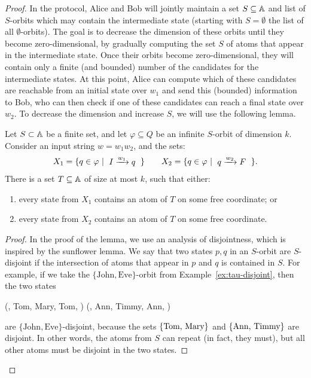 \begin{proof}
In the protocol, Alice and Bob will jointly maintain a set $S \subseteq \mathbb A$ and list of $S$-orbits which may contain the intermediate state (starting with $S = \emptyset$ the list of all $\emptyset$-orbits).
The goal is to decrease the dimension of these orbits until they become zero-dimensional, by gradually computing the set $S$ of atoms that appear in the intermediate state. Once their orbits become zero-dimensional, they will contain only a finite (and bounded) number of the candidates
for the intermediate states. At this point, Alice can compute which of these candidates are reachable from an initial state over $w_1$ and send this (bounded) information to Bob, who can then check if one of these candidates can reach a final state over $w_2$. To decrease the dimension and increase $S$, we will use the following lemma.
\begin{lemma}\label{lem:fixed-atoms}
        Let $S \subset \mathbb A$ be a finite set, and let $\varphi \subseteq Q$ be an infinite $S$-orbit 
        of dimension $k$. 
        Consider an input string $w = w_1 w_2$, and the sets:
        \begin{align*}
        X_1 = \setbuild{ q \in \varphi}{$ I \xrightarrow{w_1} q$}
        \qquad
        X_2 = \setbuild{ q \in \varphi}{$ q \xrightarrow{w_2} F$}.
        \end{align*}
        There is a set $T \subseteq \mathbb A$ of size at most $k$, such that either: 
\begin{enumerate}
    \item   every state from $X_1$ contains an atom of $T$ on some free coordinate; or 
    \item   every state from $X_2$ contains an atom of $T$ on some free coordinate.
\end{enumerate}
    \end{lemma}
    \begin{proof}
 In the proof of the lemma, we use an analysis of disjointness, which is inspired by the sunflower lemma.
 We say that two states $p,q$ in an  $S$-orbit are $S$-disjoint if the intersection of atoms that appear in $p$ and $q$ is contained in $S$.
 For example, if we take the $\{\textrm{John}, \textrm{Eve}\}$-orbit from Example~\ref{ex:tau-disjoint}, then the two states
\begin{center}
    (, Tom, Mary, Tom, ) \qquad
    (, Ann, Timmy, Ann, )
\end{center}
are $\{\textrm{John}, \textrm{Eve}\}$-disjoint, because the sets $\{\text{Tom, Mary}\}$ and $\{\text{Ann, Timmy}\}$ are disjoint. In other words, the atoms from $S$ can repeat (in fact, they must),
but all other atoms must be disjoint in the two states.


\end{proof}
\end{proof}
